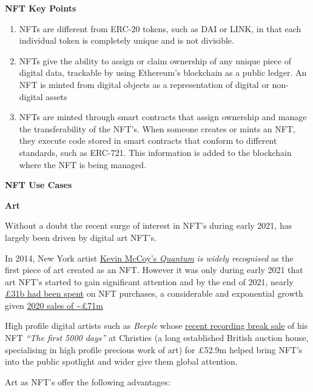 \textbf{NFT Key Points}

\begin{enumerate}
\def\labelenumi{\arabic{enumi})}
\item
  NFTs are different from ERC-20 tokens, such as DAI or LINK, in that
  each individual token is completely unique and is not divisible.
\item
  NFTs give the ability to assign or claim ownership of any unique piece
  of digital data, trackable by using Ethereum's blockchain as a public
  ledger. An NFT is minted from digital objects as a representation of
  digital or non-digital assets
\item
  NFTs are minted through smart contracts that assign ownership and
  manage the transferability of the NFT's. When someone creates or mints
  an NFT, they execute code stored in smart contracts that conform to
  different standards, such as ERC-721. This information is added to the
  blockchain where the NFT is being managed.
\end{enumerate}

\textbf{NFT Use Cases}

\textbf{Art}

Without a doubt the recent surge of interest in NFT's during early 2021,
has largely been driven by digital art NFT's.

In 2014, New York artist
\href{https://www.mccoyspace.com/project/125/}{Kevin McCoy's
\emph{Quantum}} \emph{is widely recognised} as the first piece of art
created as an NFT. However it was only during early 2021 that art NFT's
started to gain significant attention and by the end of 2021, nearly
\href{https://www.paymentscardsandmobile.com/state-of-the-blockchain-nfts-explode-onto-scene-in-2021/}{£31b
had been spent} on NFT purchases, a considerable and exponential growth
given
\href{https://raritysniper.com/news/nfts-exploded-in-2021-with-25-billion-in-sales/}{2020
sales of \textasciitilde£71m}

High profile digital artists such as \emph{Beeple} whose
\href{https://www.forbes.com/sites/abrambrown/2021/03/11/beeple-art-sells-for-693-million-becoming-most-expensive-nft-ever/?sh=3f237d1c2448}{recent
recording break sale} of his NFT \emph{``The first 5000 days''} at
Christies (a long established British auction house, specialising in
high profile precious work of art) for £52.9m helped bring NFT's into
the public spotlight and wider give them global attention.

Art as NFT's offer the following advantages:

